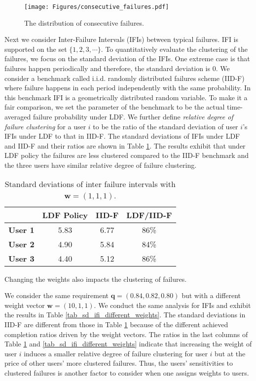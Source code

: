 \documentclass[prodmode,acmtompecs]{acmsmall}
\begin{document}
\begin{figure}[htp]
  \centering
  \texttt{[image: Figures/consecutive\_failures.pdf]}
  \caption{The distribution of consecutive failures. }
  \label{figure_consecutive_failures}
\end{figure}

Next we consider Inter-Failure Intervals (IFIs) between typical failures. 
IFI is supported on the set $\{1, 2, 3, \cdots\}$. To quantitatively evaluate the clustering of the failures, we focus on the standard deviation of the IFIs. 
One extreme case is that failures happen periodically and therefore, the standard deviation is $0$. 
We consider a benchmark called i.i.d. randomly distributed failures scheme (IID-F) where failure happens in each period independently with the same probability. 
In this benchmark IFI is a geometrically distributed random variable. 
To make it a fair comparison, we set the parameter of the benchmark to be the actual time-averaged failure probability under LDF. 
We further define {\em relative degree of failure clustering} for a user $i$ to be the ratio of the standard deviation of user $i$'s IFIs under LDF to that in IID-F.
The standard deviations of IFIs under LDF and IID-F and their ratios are shown in Table \ref{tab_sd_ifi}. 
The results exhibit that under LDF policy the failures are less clustered compared to the IID-F benchmark and the three users have similar relative degree of failure clustering. 

\begin{table}[h]
\normalsize
    \centering
    \begin{tabular}{| c | c | c | c |}
    \hline
    ~ & {\bf LDF Policy} & {\bf IID-F} & {\bf LDF/IID-F}\\
    \hline
    {\bf User 1} & 5.83 & 6.77 & 86\%	\\
    \hline
    {\bf User 2} & 4.90 & 5.84 & 84\%	\\
    \hline
    {\bf User 3} & 4.40 & 5.12 & 86\%	\\
    \hline
    \end{tabular}
    \caption{Standard deviations of inter failure intervals with $\mathbf{w} = (1,1,1)$. }
    \label{tab_sd_ifi}
\end{table}

Changing the weights also impacts the clustering of failures. 

We consider the same requirement $\mathbf{q} = (0.84, 0.82, 0.80)$ but with a different weight vector $\mathbf{w} = (10, 1, 1)$. We conduct the same analysis for IFIs and exhibit the results in Table \ref{tab_sd_ifi_different_weights}. 
The standard deviations in IID-F are different from those in Table \ref{tab_sd_ifi} because of the different achieved completion ratios driven by the weight vectors. 
The ratios in the last columns of Table \ref{tab_sd_ifi} and \ref{tab_sd_ifi_different_weights} indicate that increasing the weight of user $i$ induces a smaller relative degree of failure clustering for user $i$ but at the price of other users' more clustered failures. Thus, the users' sensitivities to clustered failures is another factor to consider when one assigns weights to users. 
\end{document}
